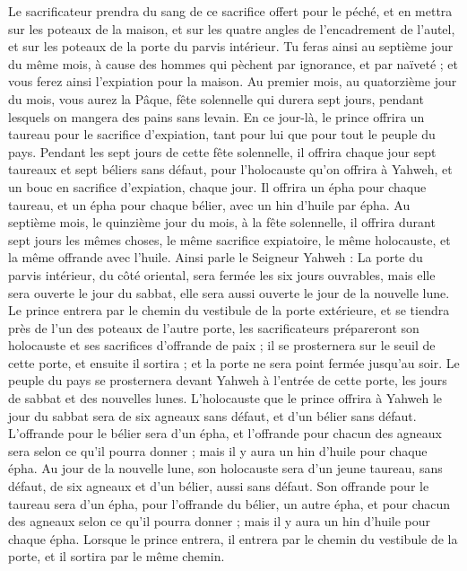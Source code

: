 \begin{multicols}{2}
Le sacrificateur prendra du sang de ce sacrifice offert pour le péché, et en mettra sur les poteaux de la maison, et sur les quatre angles de l’encadrement de l'autel, et sur les poteaux de la porte du parvis intérieur.
Tu feras ainsi au septième jour du même mois, à cause des hommes qui pèchent par ignorance, et par naïveté ; et vous ferez ainsi l’expiation pour la maison.
Au premier mois, au quatorzième jour du mois, vous aurez la Pâque, fête solennelle qui durera sept jours, pendant lesquels on mangera des pains sans levain\FTNT{}.
En ce jour-là, le prince offrira un taureau pour le sacrifice d’expiation, tant pour lui que pour tout le peuple du pays.
Pendant les sept jours de cette fête solennelle, il offrira chaque jour sept taureaux et sept béliers sans défaut, pour l'holocauste qu'on offrira à Yahweh, et un bouc en sacrifice d’expiation, chaque jour.
Il offrira un épha pour chaque taureau, et un épha pour chaque bélier, avec un hin d'huile par épha.
Au septième mois, le quinzième jour du mois, à la fête solennelle, il offrira durant sept jours les mêmes choses, le même sacrifice expiatoire, le même holocauste, et la même offrande avec l'huile.
\VerseOne{}Ainsi parle le Seigneur Yahweh : La porte du parvis intérieur, du côté oriental, sera fermée les six jours ouvrables, mais elle sera ouverte le jour du sabbat, elle sera aussi ouverte le jour de la nouvelle lune.
Le prince entrera par le chemin du vestibule de la porte extérieure, et se tiendra près de l'un des poteaux de l'autre porte, les sacrificateurs prépareront son holocauste et ses sacrifices d’offrande de paix ; il se prosternera sur le seuil de cette porte, et ensuite il sortira ; et la porte ne sera point fermée jusqu’au soir.
Le peuple du pays se prosternera devant Yahweh à l'entrée de cette porte, les jours de sabbat et des nouvelles lunes.
L'holocauste que le prince offrira à Yahweh le jour du sabbat sera de six agneaux sans défaut, et d'un bélier sans défaut.
L’offrande pour le bélier sera d'un épha, et l’offrande pour chacun des agneaux sera selon ce qu'il pourra donner ; mais il y aura un hin d'huile pour chaque épha.
Au jour de la nouvelle lune, son holocauste sera d'un jeune taureau, sans défaut, de six agneaux et d'un bélier, aussi sans défaut.
Son offrande pour le taureau sera d’un épha, pour l’offrande du bélier, un autre épha, et pour chacun des agneaux selon ce qu'il pourra donner ; mais il y aura un hin d'huile pour chaque épha.
Lorsque le prince entrera, il entrera par le chemin du vestibule de la porte, et il sortira par le même chemin.

\end{multicols}
